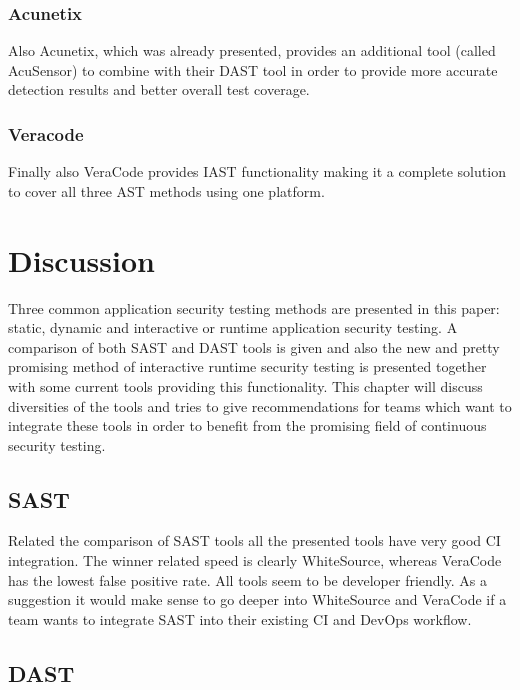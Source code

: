 \documentclass[conference]{IEEEtran}
\begin{document}
\subsubsection{Acunetix \cite{dast2}}

Also Acunetix, which was already presented, provides an additional tool (called AcuSensor) to combine with their DAST tool in order to provide more accurate detection results and better overall test coverage.\\

\subsubsection{Veracode \cite{dast7}}

Finally also VeraCode provides IAST functionality making it a complete solution to cover all three AST methods using one platform.


\section{Discussion}

Three common application security testing methods are presented in this paper: static, dynamic and interactive or runtime application security testing. A comparison of both SAST and DAST tools is given and also the new and pretty promising method of interactive runtime security testing is presented together with some current tools providing this functionality. This chapter will discuss diversities of the tools and tries to give recommendations for teams which want to integrate these tools in order to benefit from the promising field of continuous security testing.

\subsection{SAST}

Related the comparison of SAST tools all the presented tools have very good CI integration. The winner related speed is clearly WhiteSource, whereas VeraCode has the lowest false positive rate. All tools seem to be developer friendly. As a suggestion it would make sense to go deeper into WhiteSource and VeraCode if a team wants to integrate SAST into their existing CI and DevOps workflow.

\subsection{DAST}
\end{document}
